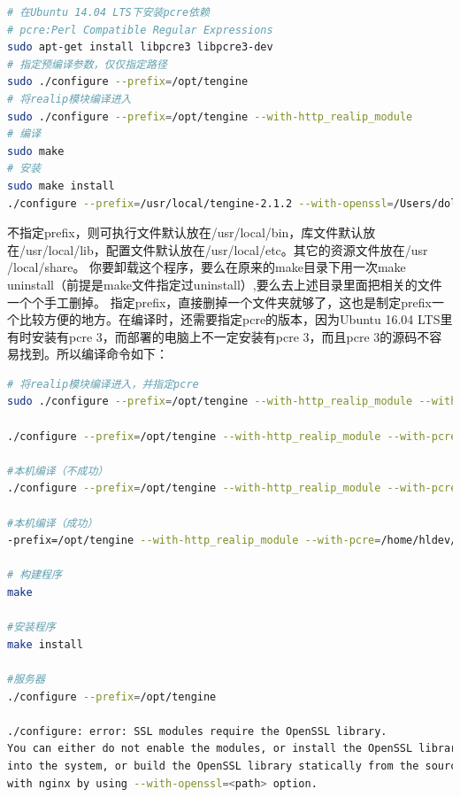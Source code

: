 \documentclass[12pt]{book}
\numberwithin{dummy}{section}
\theoremstyle{ocrenumbox}
\theoremstyle{blacknumex}
\theoremstyle{blacknumbox}
\theoremstyle{ocrenum}
\begin{document}
\begin{lstlisting}[language=bash]
# 在Ubuntu 14.04 LTS下安装pcre依赖
# pcre:Perl Compatible Regular Expressions
sudo apt-get install libpcre3 libpcre3-dev
# 指定预编译参数，仅仅指定路径
sudo ./configure --prefix=/opt/tengine
# 将realip模块编译进入
sudo ./configure --prefix=/opt/tengine --with-http_realip_module
# 编译
sudo make
# 安装
sudo make install
./configure --prefix=/usr/local/tengine-2.1.2 --with-openssl=/Users/dolphin/source/openssl
\end{lstlisting}

不指定prefix，则可执行文件默认放在/usr/local/bin，库文件默认放在/usr/local/lib，配置文件默认放在/usr/local/etc。其它的资源文件放在/usr /local/share。
你要卸载这个程序，要么在原来的make目录下用一次make uninstall（前提是make文件指定过uninstall）,要么去上述目录里面把相关的文件一个个手工删掉。
指定prefix，直接删掉一个文件夹就够了，这也是制定prefix一个比较方便的地方。在编译时，还需要指定pcre的版本，因为Ubuntu 16.04 LTS里有时安装有pcre 3，而部署的电脑上不一定安装有pcre 3，而且pcre 3的源码不容易找到。所以编译命令如下：

\begin{lstlisting}[language=bash]
# 将realip模块编译进入，并指定pcre
sudo ./configure --prefix=/opt/tengine --with-http_realip_module --with-pcre=/root/software/pcre-8.40 --with-openssl=/root/software/openssl-OpenSSL_1_1_0e --without-http_gzip_module

./configure --prefix=/opt/tengine --with-http_realip_module --with-pcre=/root/software/pcre-8.40  --without-http_gzip_module

#本机编译（不成功）
./configure --prefix=/opt/tengine --with-http_realip_module --with-pcre=/home/hldev/Downloads/pcre-8.40 --with-openssl=/home/hldev/Downloads/openssl-OpenSSL_1_0_1e --without-http_gzip_module

#本机编译（成功）
-prefix=/opt/tengine --with-http_realip_module --with-pcre=/home/hldev/Downloads/pcre-8.40 --with-openssl=/home/hldev/software/openssl-OpenSSL_1_0_2g --without-http_gzip_module

# 构建程序
make

#安装程序
make install

#服务器
./configure --prefix=/opt/tengine

./configure: error: SSL modules require the OpenSSL library.
You can either do not enable the modules, or install the OpenSSL library
into the system, or build the OpenSSL library statically from the source
with nginx by using --with-openssl=<path> option.


\end{lstlisting}
\end{document}
